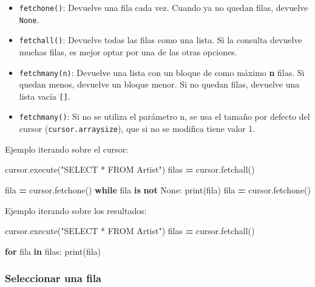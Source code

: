 \documentclass[
]{book}
\newenvironment{Shaded}{\begin{snugshade}}{\end{snugshade}}
\newcommand{\BuiltInTok}[1]{#1}
\newcommand{\ControlFlowTok}[1]{\textcolor[rgb]{0.13,0.29,0.53}{\textbf{#1}}}
\newcommand{\KeywordTok}[1]{\textcolor[rgb]{0.13,0.29,0.53}{\textbf{#1}}}
\newcommand{\NormalTok}[1]{#1}
\newcommand{\OperatorTok}[1]{\textcolor[rgb]{0.81,0.36,0.00}{\textbf{#1}}}
\newcommand{\StringTok}[1]{\textcolor[rgb]{0.31,0.60,0.02}{#1}}
\newcommand{\VariableTok}[1]{\textcolor[rgb]{0.00,0.00,0.00}{#1}}
\providecommand{\tightlist}{%
  \setlength{\itemsep}{0pt}\setlength{\parskip}{0pt}}
\theoremstyle{break}
\theoremstyle{nonumberplain}
\begin{document}
\begin{itemize}
\tightlist
\item
  \texttt{fetchone()}: Devuelve una fila cada vez. Cuando ya no quedan filas, devuelve \texttt{None}.
\item
  \texttt{fetchall()}: Devuelve todas las filas como una lista. Si la consulta devuelve muchas filas, es mejor optar por una de las otras opciones.
\item
  \texttt{fetchmany(n)}: Devuelve una lista con un bloque de como máximo \textbf{n} filas. Si quedan menos, devuelve un bloque menor. Si no quedan filas, devuelve una lista vacía \texttt{{[}{]}}.
\item
  \texttt{fetchmany()}: Si no se utiliza el parámetro n, se usa el tamaño por defecto del cursor (\texttt{cursor.arraysize}), que si no se modifica tiene valor 1.
\end{itemize}

Ejemplo iterando sobre el cursor:

\begin{Shaded}
\begin{Highlighting}[]
\NormalTok{cursor.execute(}\StringTok{"SELECT * FROM Artist"}\NormalTok{)}
\NormalTok{filas }\OperatorTok{=}\NormalTok{ cursor.fetchall()}

\NormalTok{fila }\OperatorTok{=}\NormalTok{ cursor.fetchone()}
\ControlFlowTok{while}\NormalTok{ fila }\KeywordTok{is} \KeywordTok{not} \VariableTok{None}\NormalTok{:}
    \BuiltInTok{print}\NormalTok{(fila)}
\NormalTok{    fila }\OperatorTok{=}\NormalTok{ cursor.fetchone()}
\end{Highlighting}
\end{Shaded}

Ejemplo iterando sobre los resultados:

\begin{Shaded}
\begin{Highlighting}[]
\NormalTok{cursor.execute(}\StringTok{"SELECT * FROM Artist"}\NormalTok{)}
\NormalTok{filas }\OperatorTok{=}\NormalTok{ cursor.fetchall()}

\ControlFlowTok{for}\NormalTok{ fila }\KeywordTok{in}\NormalTok{ filas:}
    \BuiltInTok{print}\NormalTok{(fila)}
\end{Highlighting}
\end{Shaded}

\subsubsection{Seleccionar una fila}\label{seleccionar-una-fila}
\end{document}
